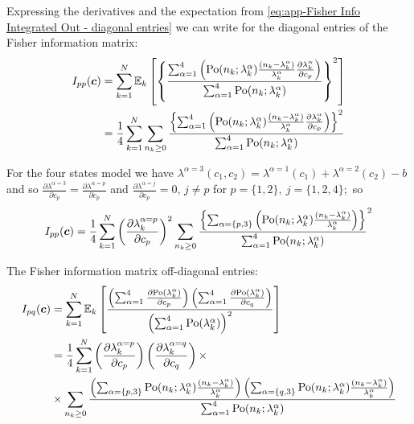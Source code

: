 Expressing the derivatives and the expectation from \autoref{eq:app-Fisher Info Integrated Out - diagonal entries} we can write for the diagonal entries of the Fisher information matrix:
%
\begin{alignat*}{2}
	I_{pp}(\bm{c}) 
	& =\sum_{k=1}^N\mathbb{E}_k\left[\left\{ \frac{\sum_{\alpha=1}^4\left(\mathrm{Po}(n_k;\lambda_k^\alpha)\frac{(n_k-\lambda_k^\alpha)}{\lambda_k^\alpha}\frac{\partial\lambda_k^\alpha}{\partial c_p}\right)}{\sum_{\alpha=1}^4\mathrm{Po}(n_k;\lambda_k^\alpha)}\right\} ^2\right]\\
 	& =\frac{1}{4}\sum_{k=1}^N\sum_{n_k\geq0}\frac{\left\{ \sum_{\alpha=1}^4\left(\mathrm{Po}(n_k;\lambda_k^\alpha)\frac{(n_k-\lambda_k^\alpha)}{\lambda_k^\alpha}\frac{\partial\lambda_k^\alpha}{\partial c_p}\right)\right\} ^2}{\sum_{\alpha=1}^4\mathrm{Po}(n_k;\lambda_k^\alpha)}
\end{alignat*}

For the four states model we have $\lambda^{\alpha=3}(c_1,c_2)=\lambda^{\alpha=1}(c_1)+\lambda^{\alpha=2}(c_2)-b$ and so $\frac{\partial\lambda^{\alpha=3}}{\partial c_p}=\frac{\partial\lambda^{\alpha=p}}{\partial c_p}$ and $\frac{\partial\lambda^{\alpha=j}}{\partial c_p}=0,\, j\neq p$ for $p=\{1,2\},\: j=\{1,2,4\};$ so 
%
\begin{equation*}
	I_{pp}(\bm{c}) 
	=\frac{1}{4}\sum_{k=1}^N\left(\frac{\partial\lambda_k^{\alpha=p}}{\partial c_p}\right)^2\sum_{n_k\geq0}\frac{\left\{\sum_{\alpha=\{p,3\}}\left(\mathrm{Po}(n_k;\lambda_k^\alpha)\frac{(n_k-\lambda_k^\alpha)}{\lambda_k^\alpha}\right)\right\}}{\sum_{\alpha=1}^4\mathrm{Po}(n_k;\lambda_k^\alpha)} ^2
\end{equation*}


The Fisher information matrix off-diagonal entries:
%
\begin{alignat*}{2}
	I_{pq}(\bm{c}) 
	& =\sum_{k=1}^N\mathbb{E}_k\left[\frac{\left(\sum_{\alpha=1}^4\frac{\partial\mathrm{Po}(\lambda_k^\alpha)}{\partial c_p}\right)\left(\sum_{\alpha=1}^4\frac{\partial\mathrm{Po}(\lambda_k^\alpha)}{\partial c_q}\right)}{\left(\sum_{\alpha=1}^4\mathrm{Po}(\lambda_k^\alpha)\right)^2}\right]\nonumber \\
 	& =\frac{1}{4}\sum_{k=1}^N\left(\frac{\partial\lambda_k^{\alpha=p}}{\partial c_p}\right)\left(\frac{\partial\lambda_k^{\alpha=q}}{\partial c_q}\right)\times\\
	&\times\sum_{n_k\geq0}\frac{\left(\sum_{\alpha=\{p,3\}}\mathrm{Po}(n_k;\lambda_k^\alpha)\frac{(n_k-\lambda_k^\alpha)}{\lambda_k^\alpha}\right)\left(\sum_{\alpha=\{q,3\}}\mathrm{Po}(n_k;\lambda_k^\alpha)\frac{(n_k-\lambda_k^\alpha)}{\lambda_k^\alpha}\right)}{\sum_{\alpha=1}^4\mathrm{Po}(n_k;\lambda_k^\alpha)}
	\label{eq:app-Fisher Info Integrated Out-off diagonal entries}
\end{alignat*}

